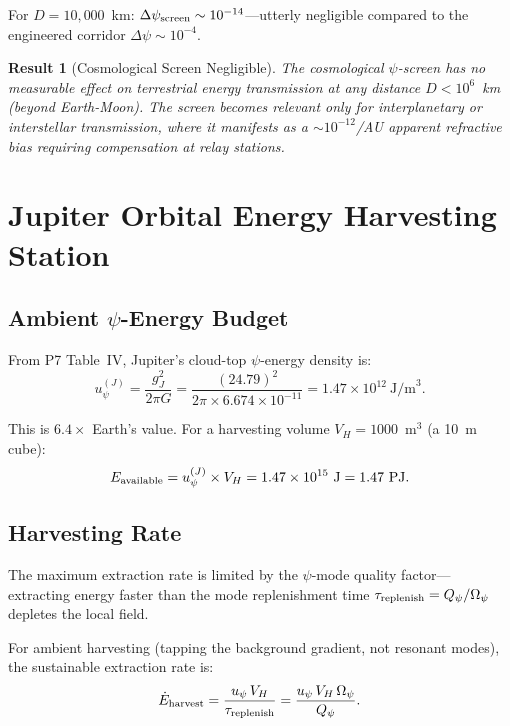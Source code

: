 \documentclass[aps,prd,twocolumn,superscriptaddress]{revtex4-2}
\newcommand{\Qpsi}{Q_\psi}
\newcommand{\Opsi}{\Omega_\psi}
\newtheorem{result}{Result}
\begin{document}
For $D = 10{,}000$~km: $\Delta\psi_{\rm screen} \sim 10^{-14}$---utterly
negligible compared to the engineered corridor $\Delta\psi \sim 10^{-4}$.

\begin{result}[Cosmological Screen Negligible]
The cosmological $\psi$-screen has no measurable effect on terrestrial
energy transmission at any distance $D < 10^6$~km (beyond Earth-Moon).
The screen becomes relevant only for interplanetary or interstellar
transmission, where it manifests as a $\sim 10^{-12}$/AU apparent
refractive bias requiring compensation at relay stations.
\end{result}

\section{Jupiter Orbital Energy Harvesting Station}
\label{sec:jupiter}

\subsection{Ambient $\psi$-Energy Budget}

From P7 Table~IV, Jupiter's cloud-top $\psi$-energy density is:
\begin{equation}
u_\psi^{(J)} = \frac{g_J^2}{2\pi G}
= \frac{(24.79)^2}{2\pi\times 6.674\times 10^{-11}}
= 1.47\times 10^{12}~\text{J/m}^3.
\end{equation}

This is $6.4\times$ Earth's value.  For a harvesting volume
$V_H = 1000$~m$^3$ (a 10~m cube):
\begin{equation}
E_{\rm available} = u_\psi^{(J)}\times V_H
= 1.47\times 10^{15}~\text{J} = 1.47~\text{PJ}.
\end{equation}

\subsection{Harvesting Rate}

The maximum extraction rate is limited by the $\psi$-mode quality
factor---extracting energy faster than the mode replenishment time
$\tau_{\rm replenish} = \Qpsi/\Opsi$ depletes the local field.

For ambient harvesting (tapping the background gradient, not resonant
modes), the sustainable extraction rate is:
\begin{equation}
\dot{E}_{\rm harvest} = \frac{u_\psi\,V_H}{\tau_{\rm replenish}}
= \frac{u_\psi\,V_H\,\Opsi}{\Qpsi}.
\end{equation}
\end{document}
